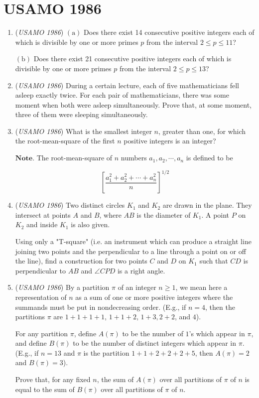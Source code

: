 \section{USAMO 1986}
        \begin{enumerate}
        	\item (\textit{USAMO 1986}) $(\text{a})$ Does there exist 14 consecutive positive integers each of which is divisible by one or more primes $p$ from the interval $2\le p \le 11$?


 $(\text{b})$ Does there exist 21 consecutive positive integers each of which is divisible by one or more primes $p$ from the interval $2\le p \le 13$?


 

	\item (\textit{USAMO 1986}) During a certain lecture, each of five mathematicians fell asleep exactly twice. For each pair of mathematicians, there was some moment when both were asleep simultaneously. Prove that, at some moment, three of them were sleeping simultaneously.


 

	\item (\textit{USAMO 1986}) What is the smallest integer $n$, greater than one, for which the root-mean-square of the first $n$ positive integers is an integer?


 $\mathbf{Note.}$ The root-mean-square of $n$ numbers $a_1, a_2, \cdots, a_n$ is defined to be

 \[\left[\frac{a_1^2 + a_2^2 + \cdots + a_n^2}n\right]^{1/2}\]


	\item (\textit{USAMO 1986}) Two distinct circles $K_1$ and $K_2$ are drawn in the plane. They intersect at points $A$ and $B$, where $AB$ is the diameter of $K_1$. A point $P$ on $K_2$ and inside $K_1$ is also given.


 Using only a "T-square" (i.e. an instrument which can produce a straight line joining two points and the perpendicular to a line through a point on or off the line), find a construction for two points $C$ and $D$ on $K_1$ such that $CD$ is perpendicular to $AB$ and $\angle CPD$ is a right angle.


 

	\item (\textit{USAMO 1986}) By a partition $\pi$ of an integer $n\ge 1$, we mean here a representation of $n$ as a sum of one or more positive integers where the summands must be put in nondecreasing order. (E.g., if $n=4$, then the partitions $\pi$ are $1+1+1+1$, $1+1+2$, $1+3, 2+2$, and $4$).


 For any partition $\pi$, define $A(\pi)$ to be the number of $1$'s which appear in $\pi$, and define $B(\pi)$ to be the number of distinct integers which appear in $\pi$. (E.g., if $n=13$ and $\pi$ is the partition $1+1+2+2+2+5$, then $A(\pi)=2$ and $B(\pi) = 3$).


 Prove that, for any fixed $n$, the sum of $A(\pi)$ over all partitions of $\pi$ of $n$ is equal to the sum of $B(\pi)$ over all partitions of $\pi$ of $n$.


 

\end{enumerate}